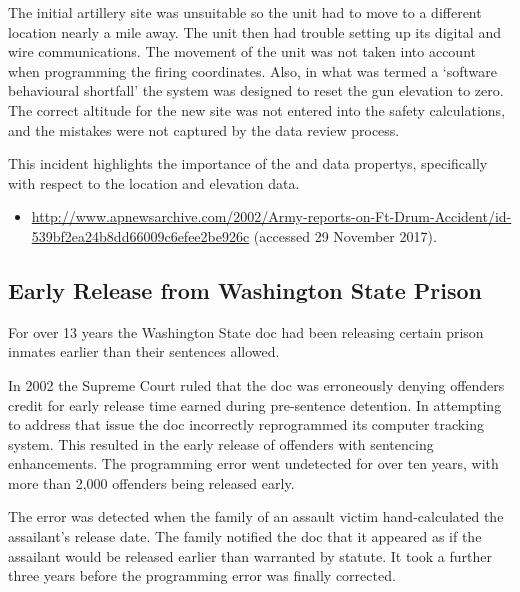 The initial artillery site was unsuitable so the unit had to move to a different location nearly a mile away. The unit then had trouble setting up its digital and wire communications. The movement of the unit was not taken into account when programming the firing coordinates. Also, in what was termed a `software behavioural shortfall' the system was designed to reset the gun elevation to zero. The correct altitude for the new site was not entered into the safety calculations, and the mistakes were not captured by the data review process.

This incident highlights the importance of the  and  \glspl{data property}, specifically with respect to the location and elevation data.

\begin{itemize}
	\item \raggedright{\href{http://www.apnewsarchive.com/2002/Army-reports-on-Ft-Drum-Accident/id-539bf2ea24b8dd66009c6efee2be926c}{http://www.apnewsarchive.com/2002/Army-reports-on-Ft-Drum-Accident/id- 539bf2ea24b8dd66009c6efee2be926c} (accessed 29 November 2017).}
\end{itemize}


\subsection{Early Release from Washington State Prison} \label{bkm:incacc:washprison}
For over 13 years the Washington State \gls{doc} had been releasing certain prison inmates earlier than their sentences allowed.

In 2002 the Supreme Court ruled that the \gls{doc} was erroneously denying offenders credit for early release time earned during pre-sentence detention. In attempting to address that issue the \gls{doc} incorrectly reprogrammed its computer tracking system. This resulted in the early release of offenders with sentencing enhancements. The programming error went undetected for over ten years, with more than 2,000 offenders being released early.

The error was detected when the family of an assault victim hand-calculated the assailant's release date. The family notified the \gls{doc} that it appeared as if the assailant would be released earlier than warranted by statute. It took a further three years before the programming error was finally corrected.

